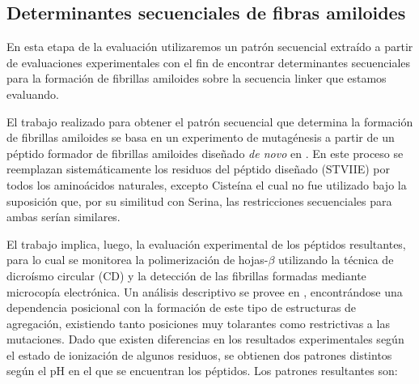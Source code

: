 \subsection{Determinantes secuenciales de fibras amiloides}\label{determinantesSecuenciales}

En esta etapa de la evaluación utilizaremos un patrón secuencial extraído a partir de evaluaciones experimentales \cite{de2004sequence} 
con el fin de encontrar determinantes secuenciales para la formación de fibrillas amiloides sobre la secuencia linker que estamos evaluando.

El trabajo realizado para obtener el patrón secuencial que determina la formación de fibrillas amiloides se basa en un experimento de mutagénesis a partir de un péptido formador de fibrillas amiloides diseñado \textit{de novo} en \cite{de2002novo}. 
En este proceso se reemplazan
sistemáticamente los residuos del péptido diseñado (STVIIE) por todos 
los aminoácidos naturales, excepto Cisteína el cual no fue utilizado bajo la suposición que, por su similitud con Serina, las restricciones secuenciales para ambas serían similares.

El trabajo implica, luego, la evaluación experimental de los péptidos resultantes, para lo cual se monitorea la polimerización de hojas-$\beta$ utilizando la técnica de dicroísmo circular (CD) y la detección de las fibrillas formadas mediante 
microcopía electrónica. Un análisis descriptivo se provee en \cite{de2004sequence}, encontrándose una dependencia posicional con la formación de este tipo de estructuras de agregación, existiendo tanto posiciones muy tolarantes como 
restrictivas a las mutaciones.
Dado que existen diferencias en los resultados experimentales según el estado de ionización de algunos residuos, se obtienen dos patrones distintos según el pH en el que se encuentran los péptidos.
Los patrones resultantes son:
\vspace{0.2cm}

